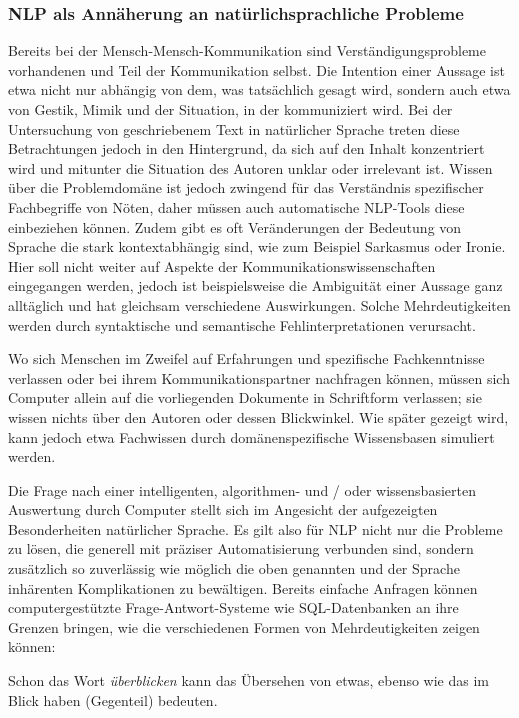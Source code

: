 \documentclass[12pt]{article}
\begin{document}
\subsubsection{NLP als Annäherung an natürlichsprachliche Probleme}
Bereits bei der Mensch-Mensch-Kommunikation sind  Verständigungsprobleme vorhandenen und Teil der Kommunikation selbst. Die Intention einer Aussage ist etwa nicht nur abhängig von dem, was tatsächlich gesagt wird, sondern auch etwa von Gestik, Mimik und der Situation, in der kommuniziert wird. Bei der Untersuchung von geschriebenem Text in natürlicher Sprache treten diese Betrachtungen jedoch in den Hintergrund, da sich auf den Inhalt konzentriert wird und mitunter die Situation des Autoren unklar oder irrelevant ist. Wissen über die Problemdomäne ist jedoch zwingend für das Verständnis spezifischer Fachbegriffe von Nöten, daher müssen auch automatische NLP-Tools diese einbeziehen können. Zudem gibt es oft Veränderungen der Bedeutung von Sprache die stark kontextabhängig sind, wie zum Beispiel Sarkasmus oder Ironie. Hier soll nicht weiter auf Aspekte der Kommunikationswissenschaften eingegangen werden, jedoch ist beispielsweise die Ambiguität einer Aussage ganz alltäglich und hat gleichsam verschiedene Auswirkungen. Solche Mehrdeutigkeiten werden durch syntaktische und semantische Fehlinterpretationen verursacht. 

Wo sich Menschen im Zweifel auf Erfahrungen und spezifische Fachkenntnisse verlassen oder bei ihrem Kommunikationspartner nachfragen können, müssen sich Computer allein auf die vorliegenden Dokumente in Schriftform verlassen; sie wissen nichts über den Autoren oder dessen Blickwinkel. Wie später gezeigt wird, kann jedoch etwa Fachwissen durch domänenspezifische Wissensbasen simuliert werden. 

Die Frage nach einer intelligenten, algorithmen- und / oder wissensbasierten Auswertung durch Computer stellt sich im Angesicht der aufgezeigten Besonderheiten natürlicher Sprache. Es gilt also für NLP nicht nur die Probleme zu lösen, die generell mit präziser Automatisierung verbunden sind, sondern zusätzlich so zuverlässig wie möglich die oben genannten und der Sprache inhärenten Komplikationen zu bewältigen. 
Bereits einfache Anfragen können computergestützte Frage-Antwort-Systeme wie SQL-Datenbanken an ihre Grenzen bringen, wie die verschiedenen Formen von Mehrdeutigkeiten zeigen können:

Schon das Wort \textit{überblicken} kann das Übersehen von etwas, ebenso wie das im Blick haben (Gegenteil) bedeuten.
\end{document}
